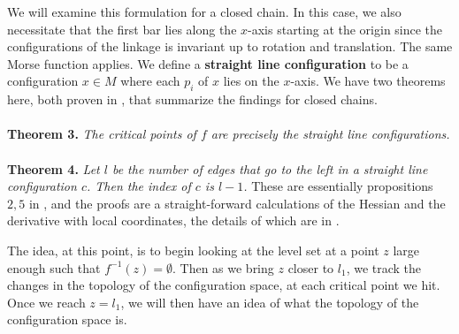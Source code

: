 \documentclass{article}
\begin{document}
We will examine this formulation for a closed chain. In this case, we also necessitate that the first bar lies along the $x$-axis starting at the origin since the configurations of the linkage is invariant up to rotation and translation. The same Morse function applies. We define a \textbf{straight line configuration} to be a configuration $x \in M$ where each $p_i$ of $x$ lies on the $x$-axis. We have two theorems here, both proven in \cite{planar}, that summarize the findings for closed chains.
\\ \\
\textbf{Theorem 3.} \emph{The critical points of $f$ are precisely the straight line configurations.}
\\ \\
\textbf{Theorem 4.} \emph{Let $l$ be the number of edges that go to the left in a straight line configuration $c$. Then the index of $c$ is $l - 1$.}
These are essentially propositions $2, 5$ in \cite{planar}, and the proofs are a straight-forward calculations of the Hessian and the derivative with local coordinates, the details of which are in \cite{planar}. 

The idea, at this point, is to begin looking at the level set at a point $z$ large enough such that $f^{-1}(z) = \emptyset$. Then as we bring $z$ closer to $l_1$, we track the changes in the topology of the configuration space, at each critical point we hit. Once we reach $z = l_1$, we will then have an idea of what the topology of the configuration space is.
\end{document}
